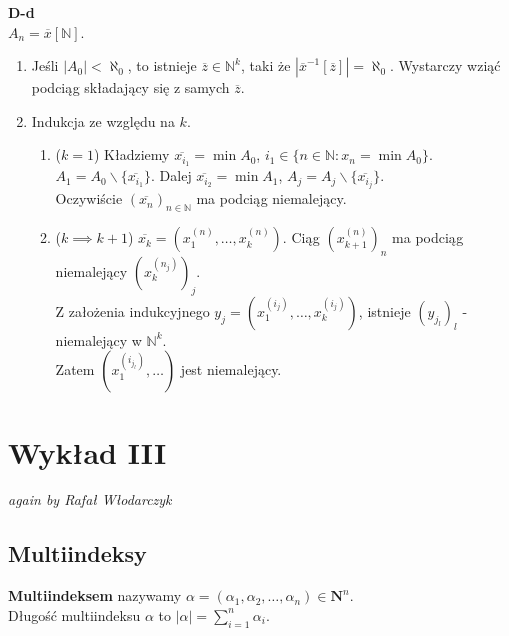\documentclass{article}
\numberwithin{equation}{subsection}
\begin{document}
\noindent
\textbf{D-d} \\
$A_n = \overline{x}[\mathbb{N}]$.

\begin{enumerate}
    \item Jeśli $|A_0| < \aleph_0$, to istnieje $\overline{z} \in \mathbb{N}^k$, taki że $| \overline{x}^{-1}[\overline{z}]| = \aleph_0$. Wystarczy wziąć podciąg składający się z samych $\overline{z}$.
    \item Indukcja ze względu na $k$.
    \begin{enumerate}
        \item ($k = 1$) Kładziemy $\overline{x_{i_1}} = \min A_0$, $i_1 \in \{n \in \mathbb{N} : x_n = \min A_0 \}$. $A_1 = A_0 \backslash \{\overline{x_{i_1}}\}$. Dalej $\overline{x_{i_2}} = \min A_1$, $A_j = A_j \backslash \{\overline{x_{i_j}}\}$. \\
        Oczywiście $(\overline{x_n})_{n \in \mathbb{N}}$ ma podciąg niemalejący.
        \item ($k \implies k + 1$) $\overline{x_k} = (x_1^{(n)}, \dots, x_k^{(n)})$. Ciąg $(x_{k+1}^{(n)})_n$ ma podciąg niemalejący $(x_k^{(n_j)})_j$. \\
        Z założenia indukcyjnego $y_j = (x_1^{(i_j)}, \dots, x_k^{(i_j)})$, istnieje $(y_{j_l})_l$ - niemalejący w $\mathbb{N}^k$. \\
        Zatem $(x_1^{(i_{j_l})}, \dots)$ jest niemalejący.
    \end{enumerate}
\end{enumerate}

\section{Wykład III}

\textit{again by Rafał Włodarczyk}\\

\subsection{Multiindeksy}
\textbf{Multiindeksem} nazywamy $\alpha = (\alpha_1, \alpha_2, \dots, \alpha_n) \in \mathbf{N}^n$. \\
Długość multiindeksu $\alpha$ to $|\alpha| = \sum_{i=1}^{n} \alpha_i$. \\
\end{document}
